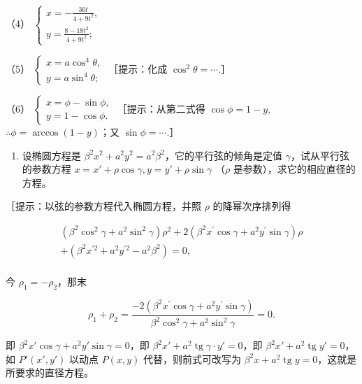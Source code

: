 （4）
\(\left\{ \begin{array}{l} x = -\frac{36t}{4 + 9t^2}, \\ y = \frac{8 - 18t^2}{4 + 9t^2}; \end{array} \right.\)

（5）
\(\left\{ \begin{array}{l} x = a \cos^4 \theta, \\ y = a \sin^4 \theta; \end{array} \right.\)
［提示：化成 \(\cos^2 \theta = \cdots\).］

（6）
\(\left\{ \begin{array}{l} x = \phi - \sin \phi, \\ y = 1 - \cos \phi. \end{array} \right.\)
［提示：从第二式得 \(\cos \phi = 1 - y,\)
\(\therefore \phi = \arccos (1 - y)\)；又 \(\sin \phi = \cdots\).］

\begin{enumerate}
\def\labelenumi{\arabic{enumi}.}
\setcounter{enumi}{2}
\tightlist
\item
  设椭圆方程是
  \(\beta^2 x^2 + a^2 y^2 = a^2 \beta^2\)，它的平行弦的倾角是定值
  \(\gamma\)，试从平行弦的参数方程
  \(x = x' + \rho \cos \gamma, y = y' + \rho \sin \gamma\) （\(\rho\)
  是参数），求它的相应直径的方程。
\end{enumerate}

［提示：以弦的参数方程代入椭圆方程，并照 \(\rho\) 的降幂次序排列得

\[
\begin{array}{l} \left(\beta^{2} \cos^{2} \gamma + a^{2} \sin^{2} \gamma\right) \rho^{2} + 2 \left(\beta^{2} x^{\prime} \cos \gamma + a^{2} y^{\prime} \sin \gamma\right) \rho \\ + \left(\beta^{2} x^{\prime 2} + a^{2} y^{\prime 2} - a^{2} \beta^{2}\right) = 0, \\ \end{array}
\]

今 \(\rho_{1} = -\rho_{2}\)，那末

\[
\rho_{1} + \rho_{2} = \frac {- 2 (\beta^{2} x^{\prime} \cos \gamma + a^{2} y^{\prime} \sin \gamma)}{\beta^{2} \cos^{2} \gamma + a^{2} \sin^{2} \gamma} = 0.
\]

即 \(\beta^2 x' \cos \gamma + a^2 y' \sin \gamma = 0\)，即
\(\beta^2 x' + a^2 \operatorname{tg} \gamma \cdot y' = 0\)，即
\(\beta^2 x' + a^2 \operatorname{tg} y' = 0\)，如 \(P'(x', y')\) 以动点
\(P(x, y)\) 代替，则前式可改写为
\(\beta^2 x + a^2 \operatorname{tg} y = 0\)，这就是所要求的直径方程。


